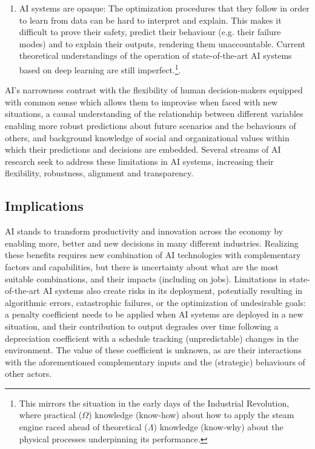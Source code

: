 \documentclass[11pt]{article}
\begin{document}
\begin{enumerate}
    \item AI systems are opaque: The optimization procedures that they follow in order to learn from data can be hard to interpret and explain. This makes it difficult to prove their safety, predict their behaviour (e.g. their failure modes) and to explain their outputs, rendering them unaccountable. Current theoretical understandings of the operation of state-of-the-art AI systems based on deep learning are still imperfect.\footnote{This mirrors the situation in the early days of the Industrial Revolution, where practical ($\Omega$) knowledge (know-how) about how to apply the steam engine raced ahead of theoretical ($\Lambda$) knowledge (know-why) about the physical processes underpinning its performance.}.
\end{enumerate}

AI's narrowness contrast with the flexibility of human decision-makers equipped with common sense which allows them to improvise when faced with new situations, a causal understanding of the relationship between different variables enabling more robust predictions about future scenarios and the behaviours of others, and background knowledge of social and organizational values within which their predictions and decisions are embedded. Several streams of AI research seek to address these limitations in AI systems, increasing their flexibility, robustness, alignment and transparency.

\subsection{Implications}
\label{subsec:implications}
AI stands to transform productivity and innovation across the economy by enabling more, better and new decisions in many different industries. Realizing these benefits requires new combination of AI technologies with complementary factors and capabilities, but there is uncertainty about what are the most suitable combinations, and their impacts (including on jobs). Limitations in state-of-the-art AI systems also create risks in its deployment, potentially resulting in algorithmic errors, catastrophic failures, or the optimization of undesirable goals: a penalty coefficient needs to be applied when AI systems are deployed in a new situation, and their contribution to output degrades over time following a depreciation coefficient with a schedule tracking (unpredictable) changes in the environment. The value of these coefficient is unknown, as are their interactions with the aforementioned complementary inputs and the (strategic) behaviours of other actors.
\end{document}
